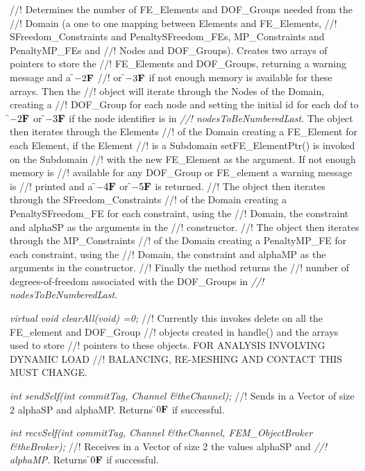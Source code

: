 //! Determines the number of FE\_Elements and DOF\_Groups needed from the
//! Domain (a one to one mapping between Elements and FE\_Elements,
//! SFreedom\_Constraints and PenaltySFreedom\_FEs, MP\_Constraints and PenaltyMP\_FEs and
//! Nodes and DOF\_Groups). Creates two arrays of pointers to store the
//! FE\_Elements and DOF\_Groups, returning a warning message and a \f$-2{\bf F}$
//! or \f$-3{\bf F}$ if not enough memory is available for these arrays. Then the
//! object will iterate through the Nodes of the Domain, creating a
//! DOF\_Group for each node and setting the initial id for each dof to
\f$-2{\bf F}$ or \f$-3{\bf F}$ if the node identifier is in {\em
//! nodesToBeNumberedLast}. The object then iterates through the Elements
//! of the Domain creating a FE\_Element for each Element, if the Element
//! is a Subdomain setFE\_ElementPtr() is invoked on the Subdomain
//! with the new FE\_Element as the argument. If not enough memory is
//! available for any DOF\_Group or FE\_element a warning message is
//! printed and a \f$-4{\bf F}$ or \f$-5{\bf F}$ is returned. 
//! The object then iterates through the SFreedom\_Constraints
//! of the Domain creating a PenaltySFreedom\_FE for each constraint, using the
//! Domain, the constraint and \p alphaSP as the arguments in the
//! constructor.
//! The object then iterates through the MP\_Constraints
//! of the Domain creating a PenaltyMP\_FE for each constraint, using the
//! Domain, the constraint and \p alphaMP as the arguments in the constructor.
//! Finally the method returns the
//! number of degrees-of-freedom associated with the DOF\_Groups in {\em
//! nodesToBeNumberedLast}.

{\em virtual void clearAll(void) =0;}
//! Currently this invokes delete on all the FE\_element and DOF\_Group
//! objects created in handle() and the arrays used to store
//! pointers to these objects. FOR ANALYSIS INVOLVING DYNAMIC LOAD
//! BALANCING, RE-MESHING AND CONTACT THIS MUST CHANGE.

{\em int sendSelf(int commitTag, Channel \&theChannel); }
//! Sends in a Vector of size 2 \p alphaSP and \p alphaMP. Returns
\f$0{\bf F}$ if successful.

{\em int recvSelf(int commitTag, Channel \&theChannel, FEM\_ObjectBroker
\&theBroker); }
//! Receives in a Vector of size 2 the values \p alphaSP and {\em
//! alphaMP}. Returns \f$0{\bf F}$ if successful. 
